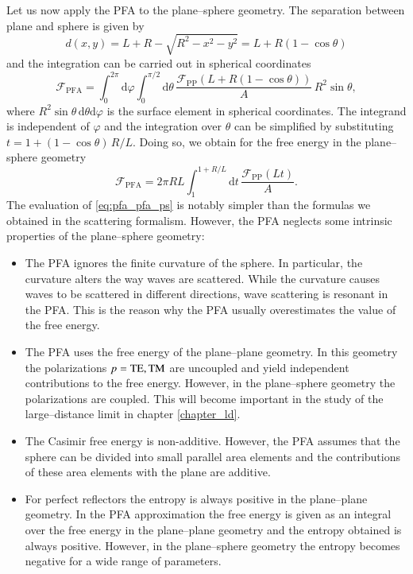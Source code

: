 Let us now apply the PFA to the plane--sphere geometry. The separation between
plane and sphere is given by
\begin{equation}
d(x,y) = L+R-\sqrt{R^2-x^2-y^2} = L+R(1-\cos\theta)
\end{equation}
and the integration can be carried out in spherical coordinates
\begin{equation}
\label{eq:pfa_pfa_generic}
\mathcal{F}_\text{PFA} = \int_0^{2\pi} \mathrm{d}\varphi \int_0^{\pi/2} \mathrm{d}\theta \, \frac{\mathcal{F}_\text{PP}\left(L+R(1-\cos\theta)\right)}{A} \, R^2\sin\theta,
\end{equation}
where $R^2 \sin\theta \, \mathrm{d}\theta \mathrm{d}\varphi$ is the surface element in
spherical coordinates. The integrand is independent of $\varphi$ and the
integration over $\theta$ can be simplified by substituting
$t=1+(1-\cos\theta) \, R/L$. Doing so, we obtain for the free energy in the
plane--sphere geometry
\begin{equation}
\label{eq:pfa_pfa_ps}
\mathcal{F}_\text{PFA} = 2\pi RL \int_1^{1+R/L} \mathrm{d}t \, \frac{\mathcal{F}_\text{PP}(Lt)}{A}.
\end{equation}
The evaluation of \eqref{eq:pfa_pfa_ps} is notably simpler than the formulas we
obtained in the scattering formalism. However, the PFA neglects some intrinsic
properties of the plane--sphere geometry:
\begin{itemize}
\item The PFA ignores the finite curvature of the sphere. In particular, the
curvature alters the way waves are scattered. While the curvature causes waves
to be scattered in different directions, wave scattering is resonant in the
PFA. This is the reason why the PFA usually overestimates the value of the free
energy.
\item The PFA uses the free energy of the plane--plane geometry. In this geometry the
polarizations $p=\mathrm{TE},\mathrm{TM}$ are uncoupled and yield independent contributions to the free
energy. However, in the plane--sphere geometry the polarizations are coupled. This will
become important in the study of the large--distance limit in chapter \ref{chapter_ld}.
\item The Casimir free energy is non-additive. However, the PFA assumes that the
sphere can be divided into small parallel area elements and the contributions of
these area elements with the plane are additive.
\item For perfect reflectors the entropy is always positive in the plane--plane geometry. In the
PFA approximation the free energy is given as an integral over the free energy in the plane--plane geometry and
the entropy obtained is always positive. However, in the plane--sphere geometry the
entropy becomes negative for a wide range of parameters.
\end{itemize}

